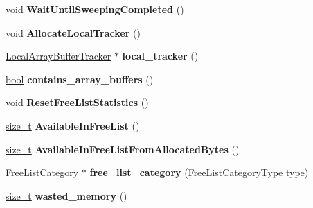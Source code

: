 \begin{DoxyCompactItemize}
\item 
\mbox{\label{classv8_1_1internal_1_1Page_a543e951f0c5b487bf13761a5fff415a6}} 
void {\bfseries Wait\+Until\+Sweeping\+Completed} ()
\item 
\mbox{\label{classv8_1_1internal_1_1Page_a618aceadf28781906ff9630fd9bc8538}} 
void {\bfseries Allocate\+Local\+Tracker} ()
\item 
\mbox{\label{classv8_1_1internal_1_1Page_a542a2623bc5dab8bd2d317c18e645063}} 
\mbox{\hyperlink{classv8_1_1internal_1_1LocalArrayBufferTracker}{Local\+Array\+Buffer\+Tracker}} $\ast$ {\bfseries local\+\_\+tracker} ()
\item 
\mbox{\label{classv8_1_1internal_1_1Page_a1d5442f6f1ddedd1f520bb0202bd513e}} 
\mbox{\hyperlink{classbool}{bool}} {\bfseries contains\+\_\+array\+\_\+buffers} ()
\item 
\mbox{\label{classv8_1_1internal_1_1Page_a7c6c838391e9167bf352cd31ea9a394a}} 
void {\bfseries Reset\+Free\+List\+Statistics} ()
\item 
\mbox{\label{classv8_1_1internal_1_1Page_afe69ab84cd307f79f93dd4d3d76d226a}} 
\mbox{\hyperlink{classsize__t}{size\+\_\+t}} {\bfseries Available\+In\+Free\+List} ()
\item 
\mbox{\label{classv8_1_1internal_1_1Page_a9aea4beb9bdd202da5202752b3271c1b}} 
\mbox{\hyperlink{classsize__t}{size\+\_\+t}} {\bfseries Available\+In\+Free\+List\+From\+Allocated\+Bytes} ()
\item 
\mbox{\label{classv8_1_1internal_1_1Page_a961113fb07d7d0b532a50181b5bf1c76}} 
\mbox{\hyperlink{classv8_1_1internal_1_1FreeListCategory}{Free\+List\+Category}} $\ast$ {\bfseries free\+\_\+list\+\_\+category} (Free\+List\+Category\+Type \mbox{\hyperlink{classstd_1_1conditional_1_1type}{type}})
\item 
\mbox{\label{classv8_1_1internal_1_1Page_ad7efdfc19025d7049564391b05a95026}} 
\mbox{\hyperlink{classsize__t}{size\+\_\+t}} {\bfseries wasted\+\_\+memory} ()

\end{DoxyCompactItemize}
